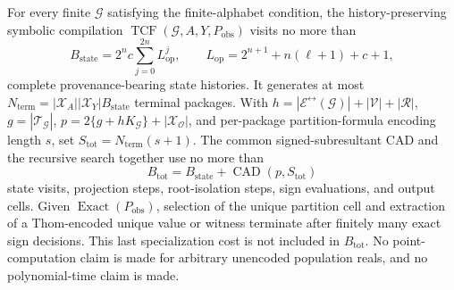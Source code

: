 For every finite \(\mathcal G\) satisfying the finite-alphabet condition, the history-preserving symbolic compilation \(\operatorname{TCF}(\mathcal G,A,Y,P_{\mathrm{obs}})\) visits no more than
\[
B_{\mathrm{state}}=2^n c\sum_{j=0}^{2n}L_{\mathrm{op}}^j,
\qquad
L_{\mathrm{op}}=2^{n+1}+n(\ell+1)+c+1,
\]
complete provenance-bearing state histories. It generates at most \(N_{\mathrm{term}}=|\mathcal X_A||\mathcal X_Y|B_{\mathrm{state}}\) terminal packages. With \(h=|\mathcal E^{\leftrightarrow}(\mathcal G)|+|\mathcal V|+|\mathcal R|\), \(g=|\mathcal T_{\mathcal G}|\), \(p=2\{g+hK_{\mathcal G}\}+|\mathcal X_{\mathcal O}|\), and per-package partition-formula encoding length \(s\), set \(S_{\mathrm{tot}}=N_{\mathrm{term}}(s+1)\). The common signed-subresultant CAD and the recursive search together use no more than
\[
B_{\mathrm{tot}}=B_{\mathrm{state}}+\operatorname{CAD}(p,S_{\mathrm{tot}})
\]
state visits, projection steps, root-isolation steps, sign evaluations, and output cells. Given \(\operatorname{Exact}(P_{\mathrm{obs}})\), selection of the unique partition cell and extraction of a Thom-encoded unique value or witness terminate after finitely many exact sign decisions. This last specialization cost is not included in \(B_{\mathrm{tot}}\). No point-computation claim is made for arbitrary unencoded population reals, and no polynomial-time claim is made.